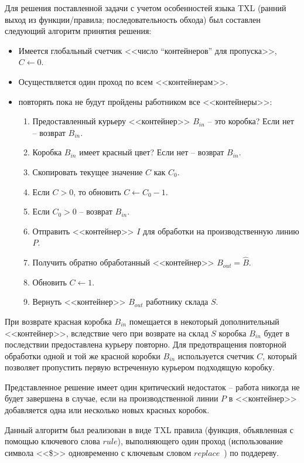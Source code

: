 Для решения поставленной задачи с учетом особенностей языка TXL (ранний выход из функции/правила; последовательность обхода) был составлен следующий алгоритм принятия решения:

\begin{itemize}[noitemsep]
  \item Имеется глобальный счетчик <<число ``контейнеров'' для пропуска>>, $C \leftarrow 0$.
  \item Осуществляется один проход по всем <<контейнерам>>.

  \item повторять пока не будут пройдены работником все <<контейнеры>>:
    \begin{enumerate}[noitemsep]
      \item Предоставленный курьеру <<контейнер>> $B_{in}$ -- это коробка? Если нет -- возврат $B_{in}$.
      \item Коробка $B_{in}$ имеет красный цвет? Если нет -- возврат $B_{in}$.
      \item Скопировать текущее значение $C$ как $C_0$.
      \item Если $C > 0$, то обновить $C \leftarrow C_0 - 1$.
      \item Если $C_0 > 0$ -- возврат $B_{in}$.
      \item Отправить <<контейнер>> $I$ для обработки на производственную линию $P$.
      \item Получить обратно обработанный <<контейнер>> $B_{out} = \hat{B}$.
      \item Обновить $C \leftarrow 1$.
      \item Вернуть <<контейнер>> $B_{out}$ работнику склада $S$.
    \end{enumerate}
\end{itemize}

При возврате красная коробка $B_{in}$ помещается в некоторый дополнительный <<контейнер>>, вследствие чего при возврате на склад $S$ коробка $B_{in}$ будет в последствии предоставлена курьеру повторно.
Для предотвращения повторной обработки одной и той же красной коробки $B_{in}$ используется счетчик $C$, который позволяет пропустить первую встреченную курьером подходящую коробку.

Представленное решение имеет один критический недостаток -- работа никогда не будет завершена в случае, если на производственной линии $P$ в <<контейнер>> добавляется одна или несколько новых красных коробок.

Данный алгоритм был реализован в виде TXL правила (функция, объявленная с помощью ключевого слова $rule$), выполняющего один проход (использование символа <<\$>> одновременно с ключевым словом $replace$~\cite{txl-book}) по поддереву.

